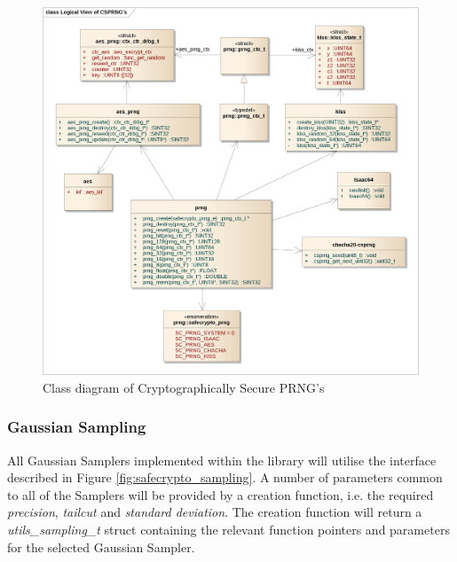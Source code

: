 \begin{figure}[!h]
\centering
\includegraphics[width=\textwidth]{libsafecrypto_csprng_logical_view.png}
\caption{Class diagram of Cryptographically Secure PRNG's}
\label{fig:safecrypto_csprng}
\end{figure}


\newpage
\subsubsection{Gaussian Sampling}

All Gaussian Samplers implemented within the library will utilise the interface described in Figure \ref{fig:safecrypto_sampling}. A number of parameters common to all of the Samplers will be provided by a creation function, i.e. the required \textit{precision}, \textit{tailcut} and \textit{standard deviation}. The creation function will return a \textit{utils\_sampling\_t} struct containing the relevant function pointers and parameters for the selected Gaussian Sampler.

